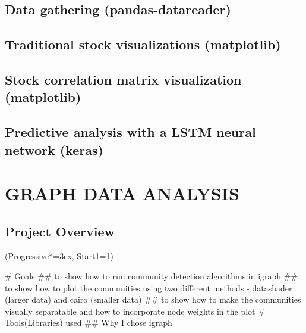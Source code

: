 \documentclass[12pt, a4paper]{article}
\let\OldEasylist\easylist
\let\OldEndEasylist\endeasylist
\renewenvironment{easylist}{%
    \OldEasylist%
    \ListProperties(Progressive*=3ex, Start1=1)%
}{%
    \OldEndEasylist%
}%
\begin{document}
\subsection{Data gathering (pandas-datareader)}

\subsection{Traditional stock visualizations (matplotlib)}

\subsection{Stock correlation matrix visualization (matplotlib)}

\subsection{Predictive analysis with a LSTM neural network (keras)}


\newpage
\section{GRAPH DATA ANALYSIS}
\subsection{Project Overview}
\begin{easylist}
# Goals
## to show how to run community detection algorithms in igraph
## to show how to plot the communities using two different methods - datashader  (larger data) and cairo (smaller data)
## to show how to make the communities visually separatable and how to incorporate node weights in the plot
# Tools(Libraries) used
## Why I chose igraph
\end{easylist}
\end{document}
